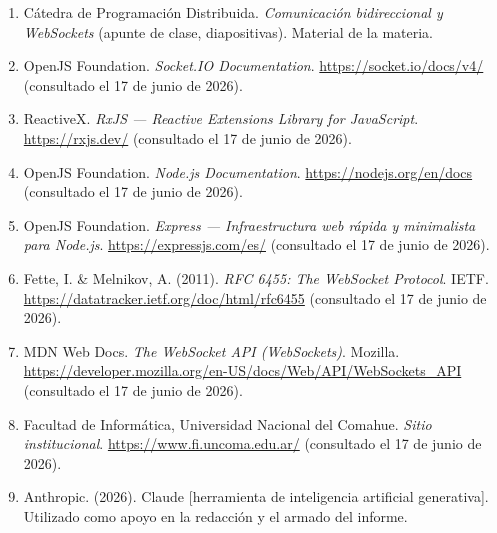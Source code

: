 \documentclass[12pt,a4paper]{article}
\begin{document}
\begin{enumerate}[leftmargin=1.6em]
    \item Cátedra de Programación Distribuida. \textit{Comunicación bidireccional y WebSockets} (apunte de clase, diapositivas). Material de la materia.
    \item OpenJS Foundation. \textit{Socket.IO Documentation}. \url{https://socket.io/docs/v4/} (consultado el 17 de junio de 2026).
    \item ReactiveX. \textit{RxJS — Reactive Extensions Library for JavaScript}. \url{https://rxjs.dev/} (consultado el 17 de junio de 2026).
    \item OpenJS Foundation. \textit{Node.js Documentation}. \url{https://nodejs.org/en/docs} (consultado el 17 de junio de 2026).
    \item OpenJS Foundation. \textit{Express — Infraestructura web rápida y minimalista para Node.js}. \url{https://expressjs.com/es/} (consultado el 17 de junio de 2026).
    \item Fette, I. \& Melnikov, A. (2011). \textit{RFC 6455: The WebSocket Protocol}. IETF. \url{https://datatracker.ietf.org/doc/html/rfc6455} (consultado el 17 de junio de 2026).
    \item MDN Web Docs. \textit{The WebSocket API (WebSockets)}. Mozilla. \url{https://developer.mozilla.org/en-US/docs/Web/API/WebSockets_API} (consultado el 17 de junio de 2026).
    \item Facultad de Informática, Universidad Nacional del Comahue. \textit{Sitio institucional}. \url{https://www.fi.uncoma.edu.ar/} (consultado el 17 de junio de 2026).
    \item Anthropic. (2026). Claude [herramienta de inteligencia artificial generativa]. Utilizado como apoyo en la redacción y el armado del informe.
\end{enumerate}
\end{document}
